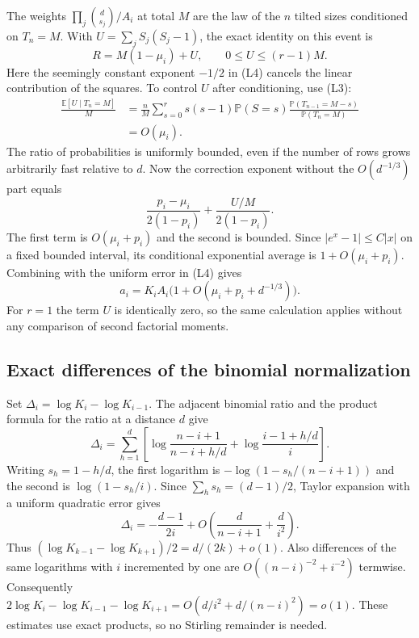 The weights $\prod_j\binom d{s_j}/A_i$ at total $M$ are the
law of the $n$ tilted sizes conditioned on $T_n=M$.
With $U=\sum_j S_j(S_j-1)$, the exact identity on this event is
\begin{equation*}
R=M(1-\mu_i)+U,\qquad 0\le U\le(r-1)M.
\end{equation*}
Here the seemingly constant exponent $-1/2$ in (L4) cancels
the linear contribution of the squares. To control $U$ after
conditioning, use (L3):
\begin{equation*}
\begin{aligned}
\frac{\mathbb E[U\mid T_n=M]}M
&=\frac nM\sum_{s=0}^r s(s-1)\mathbb P(S=s)
  \frac{\mathbb P(T_{n-1}=M-s)}{\mathbb P(T_n=M)}\\
&=O(\mu_i).
\end{aligned}
\end{equation*}
The ratio of probabilities is uniformly bounded, even if the
number of rows grows arbitrarily fast relative to $d$. Now the
correction exponent without the $O(d^{-1/3})$ part equals
\begin{equation*}
\frac{p_i-\mu_i}{2(1-p_i)}+\frac{U/M}{2(1-p_i)}.
\end{equation*}
The first term is $O(\mu_i+p_i)$ and the second is bounded.
Since $|e^x-1|\le C|x|$ on a fixed bounded interval, its
conditional exponential average is $1+O(\mu_i+p_i)$. Combining
with the uniform error in (L4) gives
\begin{equation}
a_i=K_i A_i\bigl(1+O(\mu_i+p_i+d^{-1/3})\bigr).
\tag{L5}
\end{equation}
For $r=1$ the term $U$ is identically zero, so the same
calculation applies without any comparison of second factorial moments.

\subsection{Exact differences of the binomial normalization}

Set $\Delta_i=\log K_i-\log K_{i-1}$. The adjacent binomial
ratio and the product formula for the ratio at a distance $d$
give
\begin{equation*}
\Delta_i=\sum_{h=1}^d
\left[
  \log\frac{n-i+1}{n-i+h/d}
 +\log\frac{i-1+h/d}{i}
\right].
\end{equation*}
Writing $s_h=1-h/d$, the first logarithm is
$-\log(1-s_h/(n-i+1))$ and the second is
$\log(1-s_h/i)$. Since $\sum_h s_h=(d-1)/2$, Taylor expansion
with a uniform quadratic error gives
\begin{equation*}
\Delta_i=-\frac{d-1}{2i}
+O\left(\frac{d}{n-i+1}+\frac{d}{i^2}\right).
\end{equation*}
Thus $(\log K_{k-1}-\log K_{k+1})/2=d/(2k)+o(1)$.
Also differences of the same logarithms with $i$ incremented
by one are $O((n-i)^{-2}+i^{-2})$ termwise. Consequently
$2\log K_i-\log K_{i-1}-\log K_{i+1}=O(d/i^2+d/(n-i)^2)=o(1)$.
These estimates use exact products, so no Stirling remainder
is needed.

